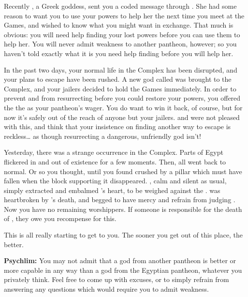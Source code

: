 \documentclass[char]{guardians}
\begin{document}
Recently \cHera{}, a Greek goddess, sent you a coded message through \cJascha{}. She had some reason to want you to use your powers to help her the next time you meet at the Games, and wished to know what you might want in exchange. That much is obvious: you will need help finding your lost powers before you can use them to help her. You will never admit weakness to another pantheon, however; so you haven't told \cHera{} exactly what it is you need help finding before you will help her.

In the past two days, your normal life in the Complex has been disrupted, and your plans to escape have been rushed. A new god called \cUnity{} was brought to the Complex, and your jailers decided to hold the Games immediately. In order to prevent \cIsis{} and \cAnubis{} from resurrecting \cSet{} before you could restore your powers, you offered the \cCaretaker{} the \iNecro{\MYname} as your pantheon's wager. You do want to win it back, of course, but for now it's safely out of the reach of anyone but your jailers. \cIsis{} and \cAnubis{} were not pleased with this, and think that your insistence on finding another way to escape is reckless\ldots{} as though resurrecting a dangerous, unfriendly god isn't!

Yesterday, there was a strange occurrence in the Complex. Parts of Egypt flickered in and out of existence for a few moments. Then, all went back to normal. Or so you thought, until you found \cEgyptianHuman{} crushed by a pillar which must have fallen when the block supporting it disappeared. \cAnubis{}, calm and silent as usual, simply extracted and embalmed \cEgyptianHuman{}'s heart, to be weighed against the \iFeather{\MYname}. \cIsis{} was heartbroken by \cEgyptianHuman{}'s death, and begged \cAnubis{} to have mercy and refrain from judging \cEgyptianHuman{\them}. Now you have no remaining worshippers. If someone is responsible for the death of \cEgyptianHuman{}, they owe you recompense for this.

This is all really starting to get to you. The sooner you get out of this place, the better.

\begin{itemz}[Notes]
  \item\textbf{Psychlim:} You may not admit that a god from another pantheon is better or more capable in any way than a god from the Egyptian pantheon, whatever you privately think. Feel free to come up with excuses, or to simply refrain from answering any questions which would require you to admit weakness.
\end{itemz}
\end{document}
